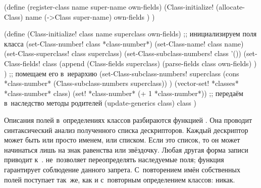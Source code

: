 \begin{code:lisp}
(define (register-class name super-name own-fields)
  (Class-initialize! (allocate-Class)
                     name
                     (->Class super-name)
                     own-fields ) )

(define (Class-initialize! class name superclass own-fields)
  ;; инициализируем поля класса
  (set-Class-number!           class *class-number*)
  (set-Class-name!             class name)
  (set-Class-superclass!       class superclass)
  (set-Class-subclass-numbers! class '())
  (set-Class-fields!
   class (append (Class-fields superclass)
                 (parse-fields class own-fields) ) )
  ;; помещаем его в~иерархию
  (set-Class-subclass-numbers!
   superclass
   (cons *class-number* (Class-subclass-numbers superclass)) )
  (vector-set! *classes* *class-number* class)
  (set! *class-number* (+ 1 *class-number*))
  ;; передаём в~наследство методы родителей
  (update-generics class)
  class )
\end{code:lisp}


Описания полей в~определениях классов разбираются функцией .
Она проводит синтаксический анализ полученного списка дескрипторов. Каждый
дескриптор может быть или просто именем, или списком. Если это список, то он
может начинаться лишь на знак равенства или звёздочку. Любая другая форма записи
приводит к~. {\Meroonet} не~позволяет переопределять
наследуемые поля; функция  гарантирует соблюдение
данного запрета. С~повторением имён собственных полей {\Meroonet} поступает
так~же, как и с~повторным определением классов: никак.


